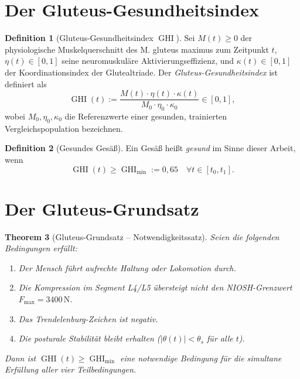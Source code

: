 ﻿\documentclass[12pt,a4paper]{report}
\theoremstyle{plain}
\newtheorem{theorem}{Theorem}[section]
\theoremstyle{definition}
\newtheorem{definition}[theorem]{Definition}
\theoremstyle{remark}
\DeclareMathOperator{\GHI}{GHI}
\begin{document}
	\section{Der Gluteus-Gesundheitsindex}
	
	\begin{definition}[Gluteus-Gesundheitsindex $\GHI$]
		\label{def:ghi}
		Sei $M(t) \geq 0$ der physiologische Muskelquerschnitt des M. gluteus maximus
		zum Zeitpunkt $t$, $\eta(t) \in [0,1]$ seine neuromuskuläre Aktivierungseffizienz,
		und $\kappa(t) \in [0,1]$ der Koordinationsindex der Glutealtriade. Der
		\emph{Gluteus-Gesundheitsindex} ist definiert als
		\[
		\GHI(t) := \frac{M(t) \cdot \eta(t) \cdot \kappa(t)}{M_0 \cdot \eta_0 \cdot \kappa_0}
		\in [0,1],
		\]
		wobei $M_0,\eta_0,\kappa_0$ die Referenzwerte einer gesunden, trainierten
		Vergleichspopulation bezeichnen.
	\end{definition}
	
	\begin{definition}[Gesundes Gesäß]
		\label{def:gesund}
		Ein Gesäß heißt \emph{gesund} im Sinne dieser Arbeit, wenn
		\[
		\GHI(t) \geq \GHI_{\min} := 0{,}65 \quad \forall t \in [t_0, t_1].
		\]
	\end{definition}
	
	\section{Der Gluteus-Grundsatz}
	
	\begin{theorem}[Gluteus-Grundsatz -- Notwendigkeitssatz]
		\label{thm:grundsatz}
		Seien die folgenden Bedingungen erfüllt:
		\begin{enumerate}[label=(\roman*)]
			\item Der Mensch führt aufrechte Haltung oder Lokomotion durch.
			\item Die Kompression im Segment L4/L5 übersteigt nicht den NIOSH-Grenzwert
			$F_{\max} = 3400\,\mathrm{N}$.
			\item Das Trendelenburg-Zeichen ist negativ.
			\item Die posturale Stabilität bleibt erhalten ($|\theta(t)| < \theta_s$
			für alle $t$).
		\end{enumerate}
		Dann ist $\GHI(t) \geq \GHI_{\min}$ eine \emph{notwendige} Bedingung
		für die simultane Erfüllung aller vier Teilbedingungen.
	\end{theorem}
	
\end{document}

